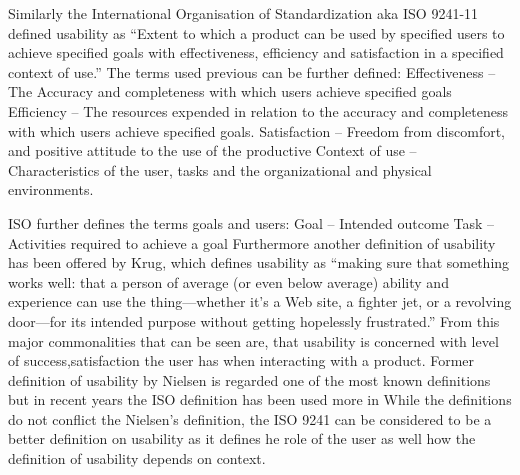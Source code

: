 \documentclass[a4paper,oneside,11pt]{report}
\begin{document}
Similarly the International Organisation of Standardization aka ISO 9241-11\autocite{ISO9241-11} defined usability as \enquote {Extent to which a product can be used by specified users to achieve specified goals with effectiveness, efficiency and satisfaction in a specified context of use.} 
The terms used previous can be further defined:
Effectiveness – The Accuracy and completeness with which users achieve specified goals
Efficiency – The resources expended in relation to the accuracy and completeness with which users achieve specified goals.
Satisfaction – Freedom from discomfort, and positive attitude to the use of the productive
Context of use – Characteristics of the user, tasks and the organizational and physical environments.

ISO further defines the terms goals and users:
Goal – Intended outcome
Task – Activities required to achieve a goal
Furthermore another definition of usability has been offered by Krug, which defines usability as \enquote {making sure that something works well: that a person of average (or even below average) ability and experience can use the 
thing—whether it’s a Web site, a fighter jet, or a revolving door—for its intended purpose without getting hopelessly frustrated.}
 From this major commonalities that can be seen are, that usability is concerned with level of success,satisfaction the user has when interacting with a product.
Former definition of usability by Nielsen is regarded one of the most known definitions but in recent years the ISO definition has been used more in 
While the definitions do not conflict the Nielsen’s definition, the ISO 9241 can be considered to be a better definition on usability as it defines he role of the user as well how the definition of usability depends on context.
\printbibliography
\end{document}
